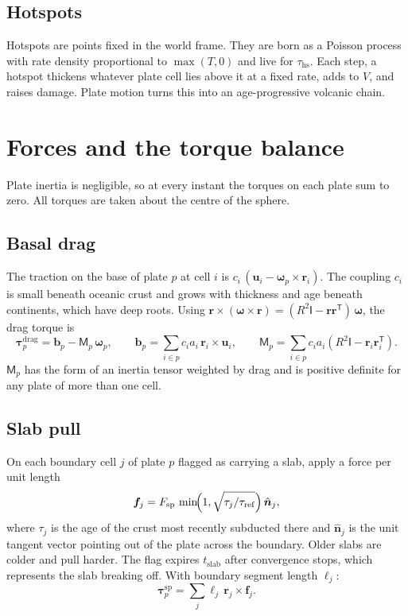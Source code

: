 \documentclass[11pt,a4paper]{article}
\newcommand{\vect}[1]{\bm{#1}}
\newcommand{\rr}{\vect{r}}
\newcommand{\om}{\vect{\omega}}
\newcommand{\uu}{\vect{u}}
\newcommand{\nn}{\hat{\vect{n}}}
\begin{document}
\subsection{Hotspots}

Hotspots are points fixed in the world frame. They are born as a Poisson
process with rate density proportional to $\max(T, 0)$ and live for
$\tau_\mathrm{hs}$. Each step, a hotspot thickens whatever plate cell lies
above it at a fixed rate, adds to $V$, and raises damage. Plate motion turns
this into an age-progressive volcanic chain.

\section{Forces and the torque balance}\label{sec:forces}

Plate inertia is negligible, so at every instant the torques on each plate sum
to zero. All torques are taken about the centre of the sphere.

\subsection{Basal drag}

The traction on the base of plate $p$ at cell $i$ is
$c_i\,(\uu_i - \om_p \times \rr_i)$. The coupling $c_i$ is small beneath
oceanic crust and grows with thickness and age beneath continents, which have
deep roots. Using
$\rr \times (\om \times \rr) = (R^2 \mathsf{I} - \rr\rr^{\mathsf T})\,\om$,
the drag torque is
\begin{equation}
\vect{\tau}^\mathrm{drag}_p = \vect{b}_p - \mathsf{M}_p\,\om_p,
\qquad
\vect{b}_p = \sum_{i \in p} c_i a_i\, \rr_i \times \uu_i,
\qquad
\mathsf{M}_p = \sum_{i \in p} c_i a_i \left(R^2 \mathsf{I} - \rr_i \rr_i^{\mathsf T}\right).
\end{equation}
$\mathsf{M}_p$ has the form of an inertia tensor weighted by drag and is
positive definite for any plate of more than one cell.

\subsection{Slab pull}

On each boundary cell $j$ of plate $p$ flagged as carrying a slab, apply a
force per unit length
\begin{equation}
\vect{f}_j = F_\mathrm{sp}\,\min\!\Bigl(1, \sqrt{\tau_j/\tau_\mathrm{ref}}\Bigr)\,\nn_j ,
\end{equation}
where $\tau_j$ is the age of the crust most recently subducted there and
$\nn_j$ is the unit tangent vector pointing out of the plate across the
boundary. Older slabs are colder and pull harder. The flag expires
$t_\mathrm{slab}$ after convergence stops, which represents the slab breaking
off. With boundary segment length $\ell_j$:
\begin{equation}
\vect{\tau}^\mathrm{sp}_p = \sum_j \ell_j\, \rr_j \times \vect{f}_j .
\end{equation}
\end{document}

